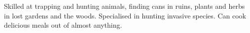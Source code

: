 \begin{npcBox}[title=Gutenberg - a Lost trapper and cook]
    \begin{stressSection}
    \end{stressSection}
    \begin{tabularx}{\textwidth}{ XX }
    \end{tabularx}
    
    \begin{consequences}
    \item {}
    \item {}
    \item {}
    \end{consequences}
    
    \begin{npcDescription}
    Skilled at trapping and hunting animals, finding cans in ruins, plants and herbs in lost gardens and the woods. Specialised in hunting invasive species. Can cook delicious meals out of almost anything.
    \end{npcDescription}
    
\end{npcBox}


